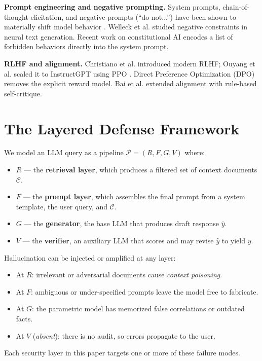 \documentclass[11pt,a4paper]{article}
\begin{document}
\textbf{Prompt engineering and negative prompting.} System prompts, chain-of-thought elicitation, and negative prompts (``do not...'') have been shown to materially shift model behavior \cite{12}. Welleck et al. \cite{13} studied negative constraints in neural text generation. Recent work on constitutional AI \cite{18} encodes a list of forbidden behaviors directly into the system prompt.

\textbf{RLHF and alignment.} Christiano et al. \cite{15} introduced modern RLHF; Ouyang et al. \cite{1} scaled it to InstructGPT using PPO \cite{16}. Direct Preference Optimization (DPO) \cite{17} removes the explicit reward model. Bai et al. \cite{18} extended alignment with rule-based self-critique.

\section{The Layered Defense Framework}
We model an LLM query as a pipeline $\mathcal{P} = (R, F, G, V)$ where:
\begin{itemize}
    \item $R$ --- the \textbf{retrieval layer}, which produces a filtered set of context documents $\mathcal{C}$.
    \item $F$ --- the \textbf{prompt layer}, which assembles the final prompt from a system template, the user query, and $\mathcal{C}$.
    \item $G$ --- the \textbf{generator}, the base LLM that produces draft response $\hat{y}$.
    \item $V$ --- the \textbf{verifier}, an auxiliary LLM that scores and may revise $\hat{y}$ to yield $y$.
\end{itemize}

Hallucination can be injected or amplified at any layer:
\begin{itemize}
    \item At $R$: irrelevant or adversarial documents cause \textit{context poisoning}.
    \item At $F$: ambiguous or under-specified prompts leave the model free to fabricate.
    \item At $G$: the parametric model has memorized false correlations or outdated facts.
    \item At $V$ (\textit{absent}): there is no audit, so errors propagate to the user.
\end{itemize}

Each security layer in this paper targets one or more of these failure modes.
\end{document}
